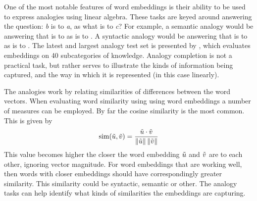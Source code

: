 \documentclass[parskip]{komatufte}
\begin{document}


One of the most notable features of  word embeddings is their ability to be used to express analogies using linear algebra.
These tasks are keyed around answering the question: \emph{b} is to \emph{a}, as what is  to \emph{c}?
For example, a semantic analogy would be answering that  is to  as  is to .
A syntactic analogy would be answering that  is to  as  is to .
The latest and largest analogy test set is presented by ,
which evaluates embeddings on 40 subcategories of knowledge.
Analogy completion is not a practical task, but rather serves to illustrate the kinds of information being captured, and the way in which it is represented (in this case linearly).


The analogies work by relating similarities of differences between the word vectors.
When evaluating word similarity using using word embeddings a number of measures can be employed.
By far the cosine similarity is the most common.
This is given by 
\begin{equation}
\mathrm{sim}(\tilde{u}, \tilde{v})=\frac{\tilde{u}\cdot \tilde{v}}{\left\Vert \tilde{u}\right\Vert \left\Vert \tilde{v}\right\Vert }
\end{equation}
This value becomes higher the closer the word embedding $\tilde{u}$ and $\tilde{v}$ are to each other, ignoring vector magnitude.
For word embeddings that are working well, then words with closer embeddings should have correspondingly greater similarity.
This similarity could be syntactic, semantic or other.
The analogy tasks can help identify what kinds of similarities the embeddings are capturing.
\end{document}
